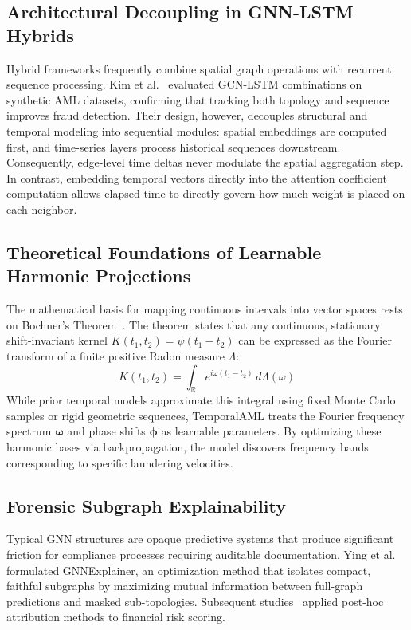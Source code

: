 \subsection{Architectural Decoupling in GNN-LSTM Hybrids}

Hybrid frameworks frequently combine spatial graph operations with recurrent sequence processing. Kim et al.~\cite{kim2022gnn} evaluated GCN-LSTM combinations on synthetic AML datasets, confirming that tracking both topology and sequence improves fraud detection. Their design, however, decouples structural and temporal modeling into sequential modules: spatial embeddings are computed first, and time-series layers process historical sequences downstream. Consequently, edge-level time deltas never modulate the spatial aggregation step. In contrast, embedding temporal vectors directly into the attention coefficient computation allows elapsed time to directly govern how much weight is placed on each neighbor.

\subsection{Theoretical Foundations of Learnable Harmonic Projections}

The mathematical basis for mapping continuous intervals into vector spaces rests on Bochner's Theorem~\cite{bochner1933monotone}. The theorem states that any continuous, stationary shift-invariant kernel $K(t_1, t_2) = \psi(t_1 - t_2)$ can be expressed as the Fourier transform of a finite positive Radon measure $\Lambda$:
\begin{equation}
K(t_1, t_2) = \int_{\mathbb{R}} e^{i \omega (t_1 - t_2)} \, d\Lambda(\omega)
\end{equation}
While prior temporal models approximate this integral using fixed Monte Carlo samples or rigid geometric sequences, TemporalAML treats the Fourier frequency spectrum $\boldsymbol{\omega}$ and phase shifts $\boldsymbol{\phi}$ as learnable parameters. By optimizing these harmonic bases via backpropagation, the model discovers frequency bands corresponding to specific laundering velocities.

\subsection{Forensic Subgraph Explainability}

Typical GNN structures are opaque predictive systems that produce significant friction for compliance processes requiring auditable documentation. Ying et al.~\cite{ying2019gnnexplainer} formulated GNNExplainer, an optimization method that isolates compact, faithful subgraphs by maximizing mutual information between full-graph predictions and masked sub-topologies. Subsequent studies~\cite{giese2022explainable, lo2023gnn} applied post-hoc attribution methods to financial risk scoring.

